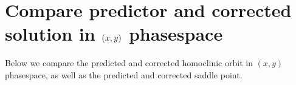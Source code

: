 \documentclass[letterpaper,10pt,english]{jupyterBook}
\begin{document}
\begin{sphinxVerbatim}[commandchars=\\\{\}]
\end{sphinxVerbatim}

\noindent{}


\section{Compare predictor and corrected solution in \protect\((x, y)\protect\) phase\sphinxhyphen{}space}
\label{\detokenize{CO-oxidation:compare-predictor-and-corrected-solution-in-x-y-phase-space}}
\sphinxAtStartPar
Below we compare the predicted and corrected homoclinic orbit in \((x, y)\)
phase\sphinxhyphen{}space, as well as the predicted and corrected saddle point.
\end{document}

